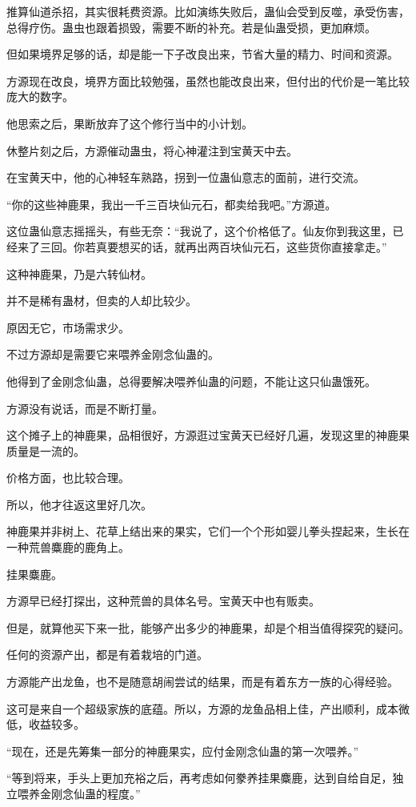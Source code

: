 \begin{this_body}
推算仙道杀招，其实很耗费资源。比如演练失败后，蛊仙会受到反噬，承受伤害，总得疗伤。蛊虫也跟着损毁，需要不断的补充。若是仙蛊受损，更加麻烦。

但如果境界足够的话，却是能一下子改良出来，节省大量的精力、时间和资源。

方源现在改良，境界方面比较勉强，虽然也能改良出来，但付出的代价是一笔比较庞大的数字。

他思索之后，果断放弃了这个修行当中的小计划。

休整片刻之后，方源催动蛊虫，将心神灌注到宝黄天中去。

在宝黄天中，他的心神轻车熟路，拐到一位蛊仙意志的面前，进行交流。

“你的这些神鹿果，我出一千三百块仙元石，都卖给我吧。”方源道。

这位蛊仙意志摇摇头，有些无奈：“我说了，这个价格低了。仙友你到我这里，已经来了三回。你若真要想买的话，就再出两百块仙元石，这些货你直接拿走。”

这种神鹿果，乃是六转仙材。

并不是稀有蛊材，但卖的人却比较少。

原因无它，市场需求少。

不过方源却是需要它来喂养金刚念仙蛊的。

他得到了金刚念仙蛊，总得要解决喂养仙蛊的问题，不能让这只仙蛊饿死。

方源没有说话，而是不断打量。

这个摊子上的神鹿果，品相很好，方源逛过宝黄天已经好几遍，发现这里的神鹿果质量是一流的。

价格方面，也比较合理。

所以，他才往返这里好几次。

神鹿果并非树上、花草上结出来的果实，它们一个个形如婴儿拳头捏起来，生长在一种荒兽麋鹿的鹿角上。

挂果麋鹿。

方源早已经打探出，这种荒兽的具体名号。宝黄天中也有贩卖。

但是，就算他买下来一批，能够产出多少的神鹿果，却是个相当值得探究的疑问。

任何的资源产出，都是有着栽培的门道。

方源能产出龙鱼，也不是随意胡闹尝试的结果，而是有着东方一族的心得经验。

这可是来自一个超级家族的底蕴。所以，方源的龙鱼品相上佳，产出顺利，成本微低，收益较多。

“现在，还是先筹集一部分的神鹿果实，应付金刚念仙蛊的第一次喂养。”

“等到将来，手头上更加充裕之后，再考虑如何豢养挂果麋鹿，达到自给自足，独立喂养金刚念仙蛊的程度。”


\end{this_body}
